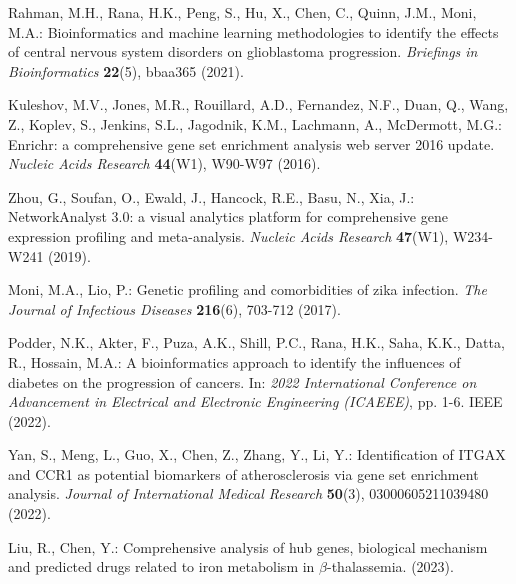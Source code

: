 \documentclass[a4paper,12pt,openbib,oneside]{memoir}
\theoremstyle{plain}
\theoremstyle{plain}
\theoremstyle{plain}
\theoremstyle{definition}
\theoremstyle{plain}
\theoremstyle{plain}
\theoremstyle{plain}
\begin{document}
\begin{thebibliography}{45}
Rahman, M.H., Rana, H.K., Peng, S., Hu, X., Chen, C., Quinn, J.M., Moni, M.A.: Bioinformatics and machine learning methodologies to identify the effects of central nervous system disorders on glioblastoma progression. \emph{Briefings in Bioinformatics} \textbf{22}(5), bbaa365 (2021).

Kuleshov, M.V., Jones, M.R., Rouillard, A.D., Fernandez, N.F., Duan, Q., Wang, Z., Koplev, S., Jenkins, S.L., Jagodnik, K.M., Lachmann, A., McDermott, M.G.: Enrichr: a comprehensive gene set enrichment analysis web server 2016 update. \emph{Nucleic Acids Research} \textbf{44}(W1), W90-W97 (2016).

Zhou, G., Soufan, O., Ewald, J., Hancock, R.E., Basu, N., Xia, J.: NetworkAnalyst 3.0: a visual analytics platform for comprehensive gene expression profiling and meta-analysis. \emph{Nucleic Acids Research} \textbf{47}(W1), W234-W241 (2019).

Moni, M.A., Lio, P.: Genetic profiling and comorbidities of zika infection. \emph{The Journal of Infectious Diseases} \textbf{216}(6), 703-712 (2017).

Podder, N.K., Akter, F., Puza, A.K., Shill, P.C., Rana, H.K., Saha, K.K., Datta, R., Hossain, M.A.: A bioinformatics approach to identify the influences of diabetes on the progression of cancers. In: \emph{2022 International Conference on Advancement in Electrical and Electronic Engineering (ICAEEE)}, pp. 1-6. IEEE (2022).

Yan, S., Meng, L., Guo, X., Chen, Z., Zhang, Y., Li, Y.: Identification of ITGAX and CCR1 as potential biomarkers of atherosclerosis via gene set enrichment analysis. \emph{Journal of International Medical Research} \textbf{50}(3), 03000605211039480 (2022).

Liu, R., Chen, Y.: Comprehensive analysis of hub genes, biological mechanism and predicted drugs related to iron metabolism in $\beta$-thalassemia. (2023).

\end{thebibliography}
\end{document}
